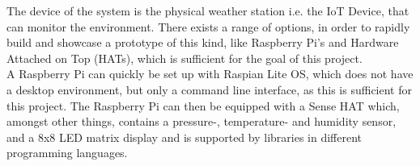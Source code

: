 The device of the system is the physical weather station i.e. the IoT Device, that can monitor the environment. There exists a range of options, in order to rapidly build and showcase a prototype of this kind, like Raspberry Pi's\cite{RPI3} and Hardware Attached on Top (HATs)\cite{HATs}, which is sufficient for the goal of this project.\\

A Raspberry Pi can quickly be set up with Raspian Lite OS\cite{Raspbian}, which does not have a desktop environment, but only a command line interface, as this is sufficient for this project. The Raspberry Pi can then be equipped with a Sense HAT\cite{SenseHAT} which, amongst other things, contains a pressure-, temperature- and humidity sensor, and a 8x8 LED matrix display and is supported by libraries in different programming languages.